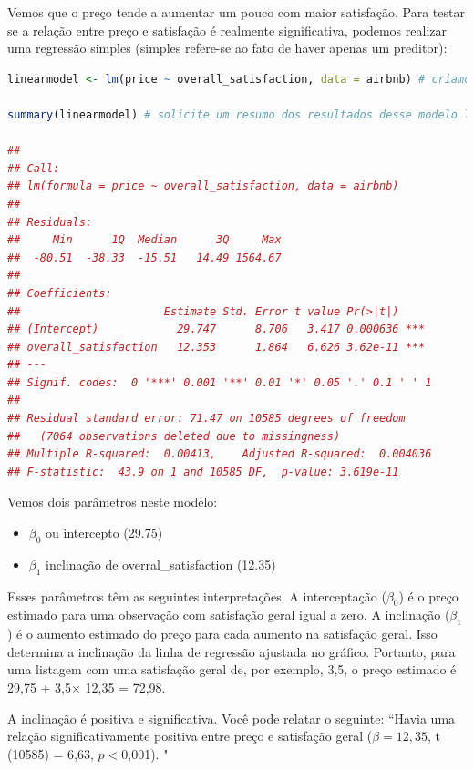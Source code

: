\documentclass{article}
\begin{document}
Vemos que o preço tende a aumentar um pouco com maior satisfação. Para testar se a relação entre preço e satisfação é realmente significativa, podemos realizar uma regressão simples (simples refere-se ao fato de haver apenas um preditor):


\begin{lstlisting}[language=R]
linearmodel <- lm(price ~ overall_satisfaction, data = airbnb) # criamos um modelo linear. O primeiro argumento eh o modelo que assume a forma de variavel dependente - variavel (s) independente (s). O segundo argumento sao os dados que devemos considerar.

summary(linearmodel) # solicite um resumo dos resultados desse modelo linear

## 
## Call:
## lm(formula = price ~ overall_satisfaction, data = airbnb)
## 
## Residuals:
##     Min      1Q  Median      3Q     Max 
##  -80.51  -38.33  -15.51   14.49 1564.67 
## 
## Coefficients:
##                      Estimate Std. Error t value Pr(>|t|)    
## (Intercept)            29.747      8.706   3.417 0.000636 ***
## overall_satisfaction   12.353      1.864   6.626 3.62e-11 ***
## ---
## Signif. codes:  0 '***' 0.001 '**' 0.01 '*' 0.05 '.' 0.1 ' ' 1
## 
## Residual standard error: 71.47 on 10585 degrees of freedom
##   (7064 observations deleted due to missingness)
## Multiple R-squared:  0.00413,    Adjusted R-squared:  0.004036 
## F-statistic:  43.9 on 1 and 10585 DF,  p-value: 3.619e-11
\end{lstlisting}

Vemos dois parâmetros neste modelo:

\begin{itemize}
    \item $\beta_{0}$ ou intercepto (29.75)
    \item $\beta_{1}$ inclinação de overral\_satisfaction (12.35)
\end{itemize}

Esses parâmetros têm as seguintes interpretações. A interceptação ($\beta_{0}$) é o preço estimado para uma observação com satisfação geral igual a zero. A inclinação ($\beta_{1}$) é o aumento estimado do preço para cada aumento na satisfação geral. Isso determina a inclinação da linha de regressão ajustada no gráfico. Portanto, para uma listagem com uma satisfação geral de, por exemplo, 3,5, o preço estimado é 29,75 + 3,5× 12,35 = 72,98.

A inclinação é positiva e significativa. Você pode relatar o seguinte: “Havia uma relação significativamente positiva entre preço e satisfação geral ($\beta = 12,35$, t (10585) = 6,63, $p <$0,001). "
\end{document}
